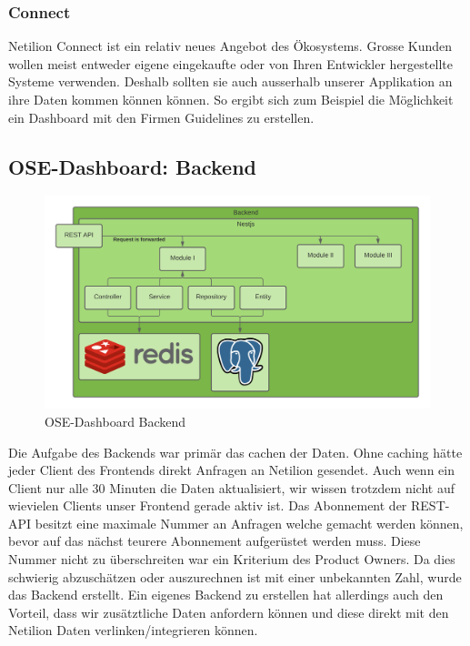 \subsubsection{Connect}
Netilion Connect ist ein relativ neues Angebot des Ökosystems. Grosse Kunden wollen meist entweder eigene eingekaufte oder von Ihren Entwickler hergestellte Systeme verwenden. Deshalb sollten sie auch ausserhalb unserer Applikation an ihre Daten kommen können können. So ergibt sich zum Beispiel die Möglichkeit ein Dashboard mit den Firmen Guidelines zu erstellen.
\subsection{OSE-Dashboard: Backend} \label{arch-backend}
\begin{figure}[!ht]
  \centering
  \includegraphics[width=.95\linewidth]{./images/backend.png}
  \caption[{Diagram OSE-Dashboard Backend von Jonas Schultheiss}]{OSE-Dashboard Backend}
  \label{fig:backend}
\end{figure}
Die Aufgabe des Backends war primär das cachen der Daten. Ohne caching hätte jeder Client des Frontends direkt Anfragen an Netilion gesendet. Auch wenn ein Client nur alle 30 Minuten die Daten aktualisiert, wir wissen trotzdem nicht auf wievielen Clients unser Frontend gerade aktiv ist. Das Abonnement der REST-API besitzt eine maximale Nummer an Anfragen welche gemacht werden können, bevor auf das nächst teurere Abonnement aufgerüstet werden muss. Diese Nummer nicht zu überschreiten war ein Kriterium des Product Owners. Da dies schwierig abzuschätzen oder auszurechnen ist mit einer unbekannten Zahl, wurde das Backend erstellt.
\newline
Ein eigenes Backend zu erstellen hat allerdings auch den Vorteil, dass wir zusätztliche Daten anfordern können und diese direkt mit den Netilion Daten verlinken/integrieren können.

